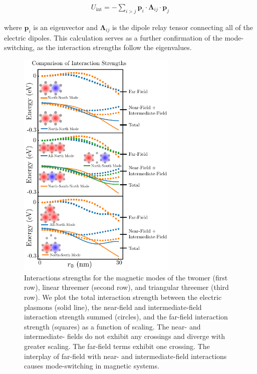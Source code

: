 \documentclass[journal=apchd5,manuscript=article]{achemso}
\begin{document}
\begin{equation}
\begin{aligned}
U_{\textrm{int}} = -\sum_{i>j}\textbf{p}_{i}\cdot\boldsymbol{\Lambda}_{ij}\cdot\textbf{p}_{j}
\label{interactionenergy}
\end{aligned}
\end{equation}

\noindent where $\textbf{p}_{i}$ is an eigenvector and $\boldsymbol{\Lambda}_{ij}$ is the dipole relay tensor connecting all of the electric dipoles. This calculation serves as a further confirmation of the mode-switching, as the interaction strengths follow the eigenvalues.

\begin{figure}
\centering
\includegraphics[width=3in]{interaction_strength.pdf}
\caption{Interactions strengths for the magnetic modes of the twomer (first row), linear threemer (second row), and triangular threemer (third row). We plot the total interaction strength between the electric plasmons (solid line), the near-field and intermediate-field interaction strength summed (circles), and the far-field interaction strength (squares) as a function of scaling. The near- and intermediate- fields do not exhibit any crossings and diverge with greater scaling. The far-field terms exhibit one crossing. The interplay of far-field with near- and intermediate-field interactions causes mode-switching in magnetic systems.}
\label{interactions}
\end{figure}
\end{document}
